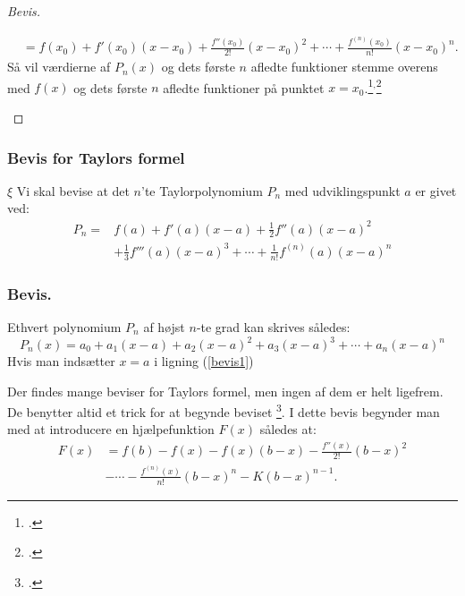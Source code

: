 \documentclass[12pt, a4paper]{article}
\begin{document}
\begin{refsection}
\begin{proof}[Bevis]
\begin{savenotes}
\begin{mdframed}
\begin{equation}
\begin{aligned}
              &=f(x_0)+f'(x_0)(x-x_0)+\frac{f''(x_0)}{2!}(x-x_0)^2+\cdots+\frac{f^{(n)}(x_0)}{n!}(x-x_0)^n.
    \end{aligned}
\end{equation}
\renewcommand{\thempfootnote}{\arabic{footnote}} 
Så vil værdierne af $P_n(x)$ og dets første $n$ afledte funktioner stemme overens med $f(x)$ og dets første $n$ afledte funktioner på punktet $x=x_0$.\footcite[s. 647-648]{calculuswithanalyticgeometry}$^,$\footcite[s.1-2]{alsholm2}%
\end{mdframed}
   \end{savenotes} 
\end{proof}
\subsubsection{Bevis for Taylors formel}
$\xi$
Vi skal bevise at det $n $'te Taylorpolynomium $P_n$ med udviklingspunkt $a$ er givet ved:
\begin{equation*}
    \begin{aligned}
        P_n= &f(a)+f'(a)(x-a)+\frac{1}{2}f''(a)(x-a)^2\\
             &+\frac{1}{3}f'''(a)(x-a)^3+\cdots+\frac{1}{n!}f^{(n)}(a)(x-a)^n
    \end{aligned}
\end{equation*}
\subsubsection{Bevis.}
Ethvert polynomium $P_n$ af højst $n$-te grad kan skrives således:
 \begin{equation}\label{bevis1}
    P_n(x)=a_0+a_1(x-a)+a_2(x-a)^2+a_3(x-a)^3+\cdots+a_n(x-a)^n
\end{equation}
Hvis man indsætter $x=a$ i ligning (\ref{bevis1})

Der findes mange beviser for Taylors formel, men ingen af dem er helt ligefrem. De benytter altid et trick for at begynde beviset \footcite[A-44]{calculuswithanalyticgeometry}. I dette bevis begynder man med at introducere en hjælpefunktion $F(x)$ således at:
\begin{equation}\label{bevisrest1}
 \begin{aligned}
     F(x)&=f(b)-f(x)-f(x)(b-x)-\frac{f''(x)}{2!}(b-x)^2\\
         &- \cdots -\frac{f^{(n)}(x)}{n!}(b-x)^n-K(b-x)^{n-1}.
\end{aligned}
\end{equation}


\end{refsection}
\end{document}
